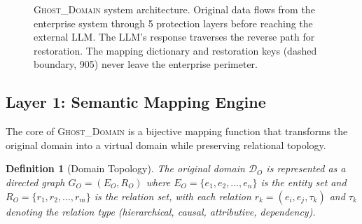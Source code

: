 \documentclass[11pt]{article}
\newtheorem{definition}{Definition}
\begin{document}
\begin{figure}[t]
\caption{\textsc{Ghost\_Domain} system architecture. Original data flows from the enterprise system through 5 protection layers before reaching the external LLM. The LLM's response traverses the reverse path for restoration. The mapping dictionary and restoration keys (dashed boundary, 905) never leave the enterprise perimeter.}
\label{fig:architecture}
\end{figure}


\subsection{Layer 1: Semantic Mapping Engine}
The core of \textsc{Ghost\_Domain} is a bijective mapping function that transforms the original domain into a virtual domain while preserving relational topology.

\begin{definition}[Domain Topology]
The original domain $\mathcal{D}_O$ is represented as a directed graph $G_O = (E_O, R_O)$ where $E_O = \{e_1, e_2, \ldots, e_n\}$ is the entity set and $R_O = \{r_1, r_2, \ldots, r_m\}$ is the relation set, with each relation $r_k = (e_i, e_j, \tau_k)$ and $\tau_k$ denoting the relation type (hierarchical, causal, attributive, dependency).
\end{definition}
\end{document}

